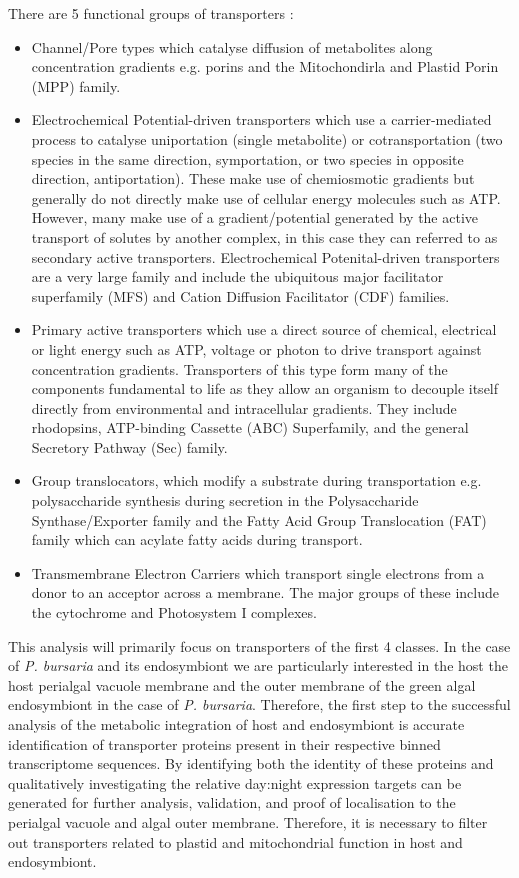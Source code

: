 There are 5 functional groups of transporters \citep{Saier2014}:
\begin{itemize}
    \item Channel/Pore types which catalyse diffusion of metabolites along concentration
        gradients e.g. porins and the Mitochondirla and Plastid Porin (MPP) family.
    \item Electrochemical Potential-driven transporters which use a carrier-mediated process to catalyse
        uniportation (single metabolite) or cotransportation (two species in the same
        direction, symportation, or two species in opposite direction, antiportation).  These make use
        of chemiosmotic gradients but generally do not directly make use of cellular energy molecules
        such as ATP. However, many make use of a gradient/potential generated by the active transport
        of solutes by another complex, in this case they can referred to as secondary active transporters.
        Electrochemical Potenital-driven transporters are a very large family and include 
        the ubiquitous major facilitator superfamily (MFS) and Cation Diffusion Facilitator (CDF) families. 
    \item Primary active transporters which use a direct source of chemical, electrical or light energy 
        such as ATP, voltage or photon to drive transport against concentration gradients.  Transporters
         of this type form many of the components fundamental to life as they allow an organism to 
         decouple itself directly from environmental and intracellular gradients. 
         They include rhodopsins, ATP-binding Cassette (ABC) Superfamily, and the general Secretory Pathway (Sec)
        family.
    \item Group translocators, which modify a substrate during transportation e.g. polysaccharide synthesis
        during secretion in the Polysaccharide Synthase/Exporter family and the Fatty Acid Group Translocation (FAT)
        family which can acylate fatty acids during transport.
    \item Transmembrane Electron Carriers which transport single electrons from a donor to an acceptor across
        a membrane. The major groups of these include the cytochrome and Photosystem I complexes. 
\end{itemize}

This analysis will primarily focus on transporters of the first 4 classes.
In the case of \textit{P. bursaria} and its endosymbiont we are
particularly interested in the host 
the host perialgal vacuole membrane and the outer membrane of the green
algal endosymbiont in the case of \textit{P. bursaria}.  
Therefore, the first step to the successful analysis of the metabolic
integration of host and endosymbiont is accurate identification of
transporter proteins present in their respective binned transcriptome
sequences.   By identifying both the identity of these proteins 
and qualitatively investigating the relative day:night expression
targets can be generated for further analysis, validation, and 
proof of localisation to the perialgal vacuole and algal outer
membrane.  Therefore, it is necessary to filter out 
transporters related to plastid and mitochondrial function in host and endosymbiont.

